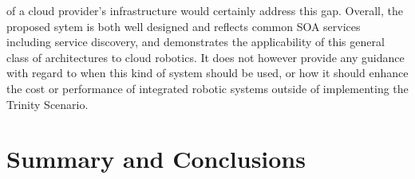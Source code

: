 \documentclass{sig-alternate}
\begin{document}
of a cloud provider's infrastructure would certainly address this gap.  Overall, the proposed sytem is both well designed and reflects common SOA services including service discovery, and demonstrates the applicability of this general class of architectures to cloud robotics.  It does not however provide any guidance with regard to when this kind of system should be used, or how it should enhance the cost or performance of integrated robotic systems outside of implementing the Trinity Scenario.

\section{Summary and Conclusions}




\end{document}
